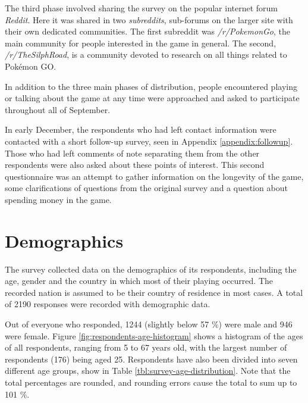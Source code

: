 The third phase involved sharing the survey on the popular internet forum \emph{Reddit}. Here it was shared in two \emph{subreddits}, sub-forums on the larger site with their own dedicated communities. The first subreddit was \emph{/r/PokemonGo}, the main community for people interested in the game in general. The second, \emph{/r/TheSilphRoad}, is a community devoted to research on all things related to Pokémon GO.

In addition to the three main phases of distribution, people encountered playing or talking about the game at any time were approached and asked to participate throughout all of September.

In early December, the respondents who had left contact information were contacted with a short follow-up survey, seen in Appendix \ref{appendix:followup}. Those who had left comments of note separating them from the other respondents were also asked about these points of interest. This second questionnaire was an attempt to gather information on the longevity of the game, some clarifications of questions from the original survey and a question about spending money in the game. 


\section{Demographics}

The survey collected data on the demographics of its respondents, including the age, gender and the country in which most of their playing occurred. The recorded nation is assumed to be their country of residence in most cases. A total of 2190 responses were recorded with demographic data.

Out of everyone who responded, 1244 (slightly below 57 \%) were male and 946 were female. Figure \ref{fig:respondents-age-histogram} shows a histogram of the ages of all respondents, ranging from 5 to 67 years old, with the largest number of respondents (176) being aged 25. Respondents have also been divided into seven different age groups, show in Table \ref{tbl:survey-age-distribution}. Note that the total percentages are rounded, and rounding errors cause the total to sum up to 101 \%.

